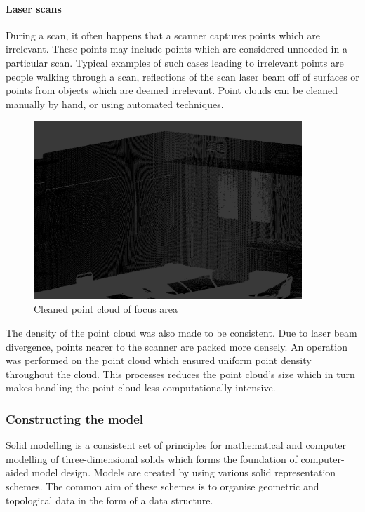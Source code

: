 \documentclass[11pt,a4paper]{report}
\begin{document}
				\paragraph{Laser scans}
					During a scan, it often happens that a scanner captures points which are irrelevant. These points may include points which are considered unneeded in a particular scan. Typical examples of such cases leading to irrelevant points are people walking through a scan, reflections of the scan laser beam off of surfaces or points from objects which are deemed irrelevant. Point clouds can be cleaned manually by hand, or using automated techniques.
				
					\begin{figure}[h!]
						\centering
						\includegraphics[width=0.9\textwidth]{cleaned_pc}
						\caption{Cleaned point cloud of focus area}
					\end{figure}
				
					The density of the point cloud was also made to be consistent. Due to laser beam divergence, points nearer to the scanner are packed more densely. An operation was performed on the point cloud which ensured uniform point density throughout the cloud. This processes reduces the point cloud's size which in turn makes handling the point cloud less computationally intensive.
					\cite{_selection_????}
				
			\subsubsection{Constructing the model}
				Solid modelling is a consistent set of principles for mathematical and computer modelling of three-dimensional solids which forms the foundation of computer-aided model design. 
				\cite{vadim_shapiro_solid_2001}
				Models are created by using various solid representation schemes. The common aim of these schemes is to organise geometric and topological data in the form of a data structure. 
				
\end{document}
